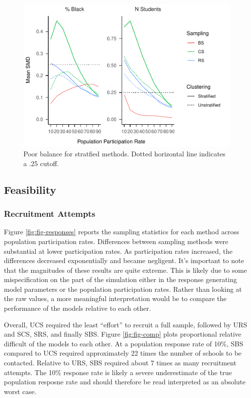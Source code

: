 \documentclass[man,floatsintext]{apa6}
\begin{document}
\begin{figure}
\centering
\includegraphics{GenSamp-Paper_files/figure-latex/fig-SMD-by-Var-bad-1.pdf}
\caption{\label{fig:fig-SMD-by-Var-bad}Poor balance for stratfied methods. Dotted horizontal line indicates a .25 cutoff.}
\end{figure}

\hypertarget{feasibility-1}{%
\subsection{Feasibility}\label{feasibility-1}}

\hypertarget{recruitment-attempts}{%
\subsubsection{Recruitment Attempts}\label{recruitment-attempts}}

Figure \ref{fig:fig-responses} reports the sampling statistics for each method across population participation rates. Differences between sampling methods were substantial at lower participation rates. As participation rates increased, the differences decreased exponentially and became negligent. It's important to note that the magnitudes of these results are quite extreme. This is likely due to some mispecification on the part of the simulation either in the response generating model parameters or the population participation rates. Rather than looking at the raw values, a more meaningful interpretation would be to compare the performance of the models relative to each other.

Overall, UCS required the least \enquote{effort} to recruit a full sample, followed by URS and SCS, SRS, and finally SBS. Figure \ref{fig:fig-comp} plots proportional relative difficult of the models to each other. At a population response rate of 10\%, SBS compared to UCS required approximately 22 times the number of schools to be contacted. Relative to URS, SBS required about 7 times as many recruitment attempts. The 10\% response rate is likely a severe underestimate of the true population resposne rate and should therefore be read interpreted as an absolute worst case.
\end{document}
